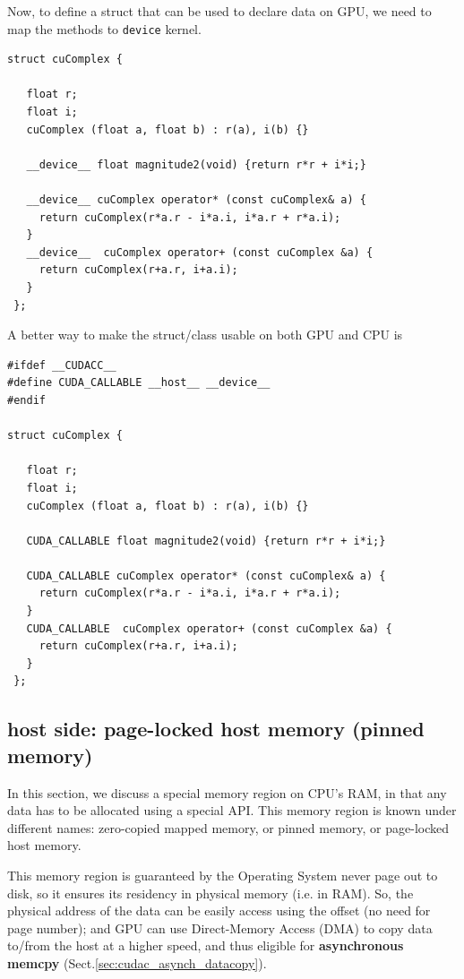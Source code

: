 Now, to define a struct that can be used to declare data on GPU, we need to map
the methods to \verb!device! kernel.
\begin{lstlisting}
struct cuComplex {

   float r;
   float i;
   cuComplex (float a, float b) : r(a), i(b) {}
   
   __device__ float magnitude2(void) {return r*r + i*i;}
   
   __device__ cuComplex operator* (const cuComplex& a) {
     return cuComplex(r*a.r - i*a.i, i*a.r + r*a.i);
   }
   __device__  cuComplex operator+ (const cuComplex &a) {
     return cuComplex(r+a.r, i+a.i);
   }
 };
\end{lstlisting}

A better way to make the struct/class usable on both GPU and CPU is
\begin{verbatim}
#ifdef __CUDACC__
#define CUDA_CALLABLE __host__ __device__
#endif

struct cuComplex {

   float r;
   float i;
   cuComplex (float a, float b) : r(a), i(b) {}
   
   CUDA_CALLABLE float magnitude2(void) {return r*r + i*i;}
   
   CUDA_CALLABLE cuComplex operator* (const cuComplex& a) {
     return cuComplex(r*a.r - i*a.i, i*a.r + r*a.i);
   }
   CUDA_CALLABLE  cuComplex operator+ (const cuComplex &a) {
     return cuComplex(r+a.r, i+a.i);
   }
 };
\end{verbatim}



\subsection{host side: page-locked host memory (pinned memory)}
\label{sec:cudac_pagelocked}
\label{sec:zero-copied-mapped-memory}
\label{sec:pinned-memory}
\label{sec:page-locked-host-memory}

In this section, we discuss a special memory region on CPU's RAM, in that any
data has to be  allocated using a special API.
This memory region is known under different names:
zero-copied mapped memory, or pinned memory, or page-locked host memory.

This memory region is guaranteed by the Operating System never page out to disk,
so it ensures its residency in physical memory (i.e. in RAM). So, the physical
address of the data can be easily access using the offset (no need for page
number); and GPU can use Direct-Memory Access (DMA) to copy data to/from the
host at a higher speed, and thus eligible for {\bf asynchronous memcpy}
(Sect.\ref{sec:cudac_asynch_datacopy}).


